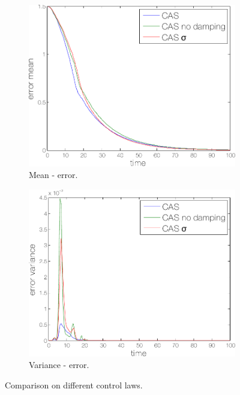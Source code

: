 \begin{figure}
\centering
\begin{subfigure}{0.4\linewidth}
\includegraphics[width=\linewidth]{./images/cas_err_mean}
\caption{Mean - error.}
\label{fig:cas:sims1:mean}
\end{subfigure}
\begin{subfigure}{0.4\linewidth}
\includegraphics[width=\linewidth]{./images/cas_err_var}
\caption{Variance - error.}
\label{fig:cas:sims1:var}
\end{subfigure}
\caption{Comparison on different control laws.}
\label{fig:cas1:sims}
\end{figure}

